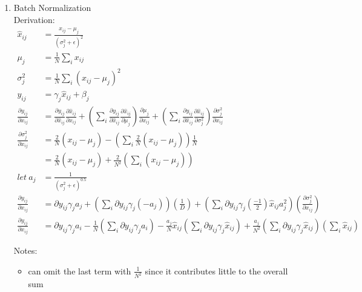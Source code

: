 \documentclass[12pt,letter]{article}
\begin{document}

\begin{enumerate}

\item Batch Normalization\\
  Derivation:
    \begin{align*}
    \hat{x}_{ij}&=\frac{x_{ij}-\mu_j}{(\sigma_j^2+\epsilon)^2}\\
    \mu_j&=\frac{1}{N}\sum_i x_{ij}\\
    \sigma_j^2&=\frac{1}{N}\sum_i (x_{ij}-\mu_j)^2\\
    y_{ij}&=\gamma_j \hat{x}_{ij} + \beta_j\\
    \frac{\partial y_{ij}}{\partial x_{ij}}&=\frac{\partial y_{ij}}{\partial \hat{x}_{ij}} \frac{\partial \hat{x}_{ij}}{\partial x_{ij}}
                                             + (\sum_i \frac{\partial y_{ij}}{\partial \hat{x}_{ij}} \frac{\partial \hat{x}_{ij}}{\partial \mu_j} ) \frac{\partial \mu_j}{\partial x_{ij}}
                                             + (\sum_i \frac{\partial y_{ij}}{\partial \hat{x}_{ij}} \frac{\partial \hat{x}_{ij}}{\partial \sigma_j^2}) \frac{\partial \sigma_j^2}{\partial x_{ij}}\\
    \frac{\partial \sigma_j^2}{\partial x_{ij}} &= \frac{2}{N}(x_{ij}-\mu_j) - (\sum_i \frac{2}{N}(x_{ij}-\mu_j))\frac{1}{N}\\
                &=\frac{2}{N}(x_{ij}-\mu_j) + \frac{2}{N^2}(\sum_i (x_{ij}-\mu_j))\\
    let\ a_j&= \frac{1}{(\sigma_j^2+\epsilon)^{0.5}}\\
    \frac{\partial y_{ij}}{\partial x_{ij}}&= \partial y_{ij} \gamma_j a_j
                                             + (\sum_i \partial y_{ij} \gamma_j (-a_j))(\frac{1}{D})
                                             + (\sum_i \partial y_{ij} \gamma_j (\frac{-1}{2}) \hat{x}_{ij} a_j^2)(\frac{\partial \sigma_j^2}{\partial x_{ij}})\\
    \frac{\partial y_{ij}}{\partial x_{ij}}&= \partial y_{ij} \gamma_j a_i
                                             - \frac{1}{N} (\sum_i \partial y_{ij} \gamma_j a_i)
                                             - \frac{a_j}{N}\hat{x}_{ij}(\sum_i \partial y_{ij} \gamma_j \hat{x}_{ij}) + \frac{a_j}{N^2}(\sum_i\partial y_{ij} \gamma_j \hat{x}_{ij})(\sum_i \hat{x}_{ij})
    \end{align*}

  Notes:
  \begin{itemize}
    \item can omit the last term with $\frac{1}{N^2}$ since it contributes little to the overall sum
    \end{itemize}


\end{enumerate}
\end{document}
